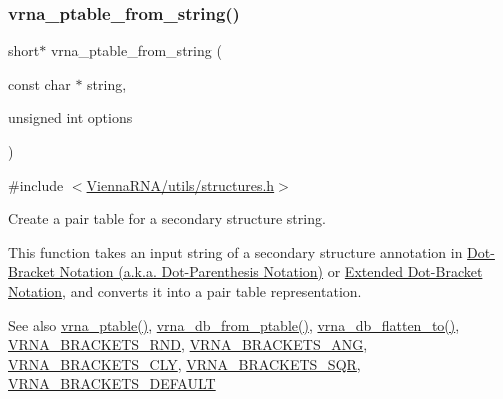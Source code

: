 \subsubsection{\texorpdfstring{vrna\+\_\+ptable\+\_\+from\+\_\+string()}{vrna\_ptable\_from\_string()}}
{\footnotesize\ttfamily short$\ast$ vrna\+\_\+ptable\+\_\+from\+\_\+string (\begin{DoxyParamCaption}\item[{const char $\ast$}]{string,  }\item[{unsigned int}]{options }\end{DoxyParamCaption})}



{\ttfamily \#include $<$\hyperlink{utils_2structures_8h}{Vienna\+R\+N\+A/utils/structures.\+h}$>$}



Create a pair table for a secondary structure string. 

This function takes an input string of a secondary structure annotation in \hyperlink{rna_structure_notations_dot-bracket-notation}{Dot-\/\+Bracket Notation (a.\+k.\+a. Dot-\/\+Parenthesis Notation)} or \hyperlink{rna_structure_notations_dot-bracket-ext-notation}{Extended Dot-\/\+Bracket Notation}, and converts it into a pair table representation.

\begin{DoxySeeAlso}{See also}
\hyperlink{group__struct__utils__pair__table_gae829fb8bb7f694c12a9c0bbc34c77c60}{vrna\+\_\+ptable()}, \hyperlink{group__struct__utils__dot__bracket_gaf9ecd0d7877fecdbb0292e24f40283d5}{vrna\+\_\+db\+\_\+from\+\_\+ptable()}, \hyperlink{group__struct__utils__dot__bracket_ga690425199c8b71545e7196e3af1436f8}{vrna\+\_\+db\+\_\+flatten\+\_\+to()}, \hyperlink{group__struct__utils__dot__bracket_gac92d5fa7c6625bce2670ece510a24fbd}{V\+R\+N\+A\+\_\+\+B\+R\+A\+C\+K\+E\+T\+S\+\_\+\+R\+ND}, \hyperlink{group__struct__utils__dot__bracket_ga863e03f7f73f10fc9bbcbefbdda4bec8}{V\+R\+N\+A\+\_\+\+B\+R\+A\+C\+K\+E\+T\+S\+\_\+\+A\+NG}, \hyperlink{group__struct__utils__dot__bracket_gaf41be40e79cb756c4e0bb8edb4d803d2}{V\+R\+N\+A\+\_\+\+B\+R\+A\+C\+K\+E\+T\+S\+\_\+\+C\+LY}, \hyperlink{group__struct__utils__dot__bracket_ga60525d61d7496eeea490a37f3d6bf757}{V\+R\+N\+A\+\_\+\+B\+R\+A\+C\+K\+E\+T\+S\+\_\+\+S\+QR}, \hyperlink{group__struct__utils__dot__bracket_ga559ebf76b1b289f85309f4206e99aa1a}{V\+R\+N\+A\+\_\+\+B\+R\+A\+C\+K\+E\+T\+S\+\_\+\+D\+E\+F\+A\+U\+LT}
\end{DoxySeeAlso}

